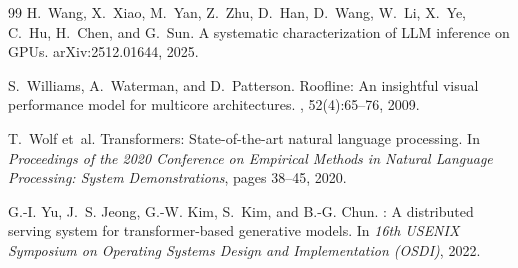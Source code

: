 \documentclass[11pt]{article}
\begin{document}
\begin{thebibliography}{99}
H.~Wang, X.~Xiao, M.~Yan, Z.~Zhu, D.~Han, D.~Wang, W.~Li, X.~Ye, C.~Hu, H.~Chen, and G.~Sun.
\newblock A systematic characterization of {LLM} inference on {GPUs}.
\newblock arXiv:2512.01644, 2025.

S.~Williams, A.~Waterman, and D.~Patterson.
\newblock Roofline: An insightful visual performance model for multicore architectures.
, 52(4):65--76, 2009.

T.~Wolf et~al.
\newblock Transformers: State-of-the-art natural language processing.
\newblock In {\em Proceedings of the 2020 Conference on Empirical Methods in Natural Language Processing: System Demonstrations}, pages 38--45, 2020.

G.-I. Yu, J.~S. Jeong, G.-W. Kim, S.~Kim, and B.-G. Chun.
: A distributed serving system for transformer-based generative models.
\newblock In {\em 16th USENIX Symposium on Operating Systems Design and Implementation (OSDI)}, 2022.

\end{thebibliography}
\end{document}

